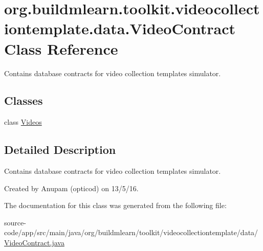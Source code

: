 \hypertarget{classorg_1_1buildmlearn_1_1toolkit_1_1videocollectiontemplate_1_1data_1_1VideoContract}{}\section{org.\+buildmlearn.\+toolkit.\+videocollectiontemplate.\+data.\+Video\+Contract Class Reference}
\label{classorg_1_1buildmlearn_1_1toolkit_1_1videocollectiontemplate_1_1data_1_1VideoContract}


Contains database contracts for video collection template\textquotesingle{}s simulator.  


\subsection*{Classes}
\begin{DoxyCompactItemize}
\item 
class \hyperlink{classorg_1_1buildmlearn_1_1toolkit_1_1videocollectiontemplate_1_1data_1_1VideoContract_1_1Videos}{Videos}
\end{DoxyCompactItemize}


\subsection{Detailed Description}
Contains database contracts for video collection template\textquotesingle{}s simulator. 

Created by Anupam (opticod) on 13/5/16. 

The documentation for this class was generated from the following file\+:\begin{DoxyCompactItemize}
\item 
source-\/code/app/src/main/java/org/buildmlearn/toolkit/videocollectiontemplate/data/\hyperlink{VideoContract_8java}{Video\+Contract.\+java}\end{DoxyCompactItemize}
